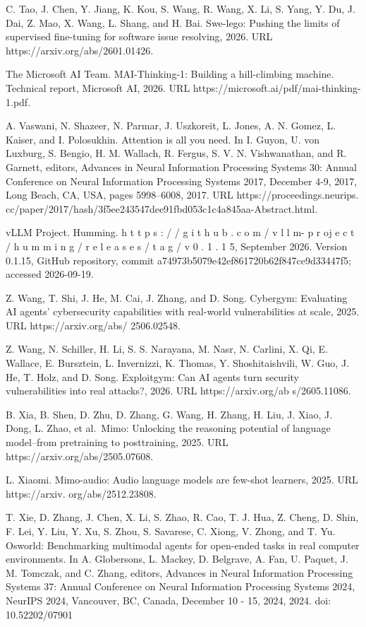 \documentclass[
  10
]{article}
\begin{document}
C. Tao, J. Chen, Y. Jiang, K. Kou, S. Wang, R. Wang, X. Li, S. Yang, Y.
Du, J. Dai, Z. Mao, X. Wang, L. Shang, and H. Bai. Swe-lego: Pushing the
limits of supervised fine-tuning for software issue resolving, 2026. URL
https://arxiv.org/abs/2601.01426.

The Microsoft AI Team. MAI-Thinking-1: Building a hill-climbing machine.
Technical report, Microsoft AI, 2026. URL
https://microsoft.ai/pdf/mai-thinking-1.pdf.

A. Vaswani, N. Shazeer, N. Parmar, J. Uszkoreit, L. Jones, A. N. Gomez,
L. Kaiser, and I. Polosukhin. Attention is all you need. In I. Guyon, U.
von Luxburg, S. Bengio, H. M. Wallach, R. Fergus, S. V. N. Vishwanathan,
and R. Garnett, editors, Advances in Neural Information Processing
Systems 30: Annual Conference on Neural Information Processing Systems
2017, December 4-9, 2017, Long Beach, CA, USA, pages 5998--6008, 2017.
URL https://proceedings.neurips.
cc/paper/2017/hash/3f5ee243547dee91fbd053c1c4a845aa-Abstract.html.

vLLM Project. Humming. h t t p s : / / g i t h u b . c o m / v l l m- p
r oj e c t / h u m m i n g / r e l e a s e s / t a g / v 0 . 1 . 1 5,
September 2026. Version 0.1.15, GitHub repository, commit
a74973b5079e42ef861720b62f847ce9d33447f5; accessed 2026-09-19.

Z. Wang, T. Shi, J. He, M. Cai, J. Zhang, and D. Song. Cybergym:
Evaluating AI agents' cybersecurity capabilities with real-world
vulnerabilities at scale, 2025. URL https://arxiv.org/abs/ 2506.02548.

Z. Wang, N. Schiller, H. Li, S. S. Narayana, M. Nasr, N. Carlini, X. Qi,
E. Wallace, E. Bursztein, L. Invernizzi, K. Thomas, Y. Shoshitaishvili,
W. Guo, J. He, T. Holz, and D. Song. Exploitgym: Can AI agents turn
security vulnerabilities into real attacks?, 2026. URL
https://arxiv.org/ab s/2605.11086.

B. Xia, B. Shen, D. Zhu, D. Zhang, G. Wang, H. Zhang, H. Liu, J. Xiao,
J. Dong, L. Zhao, et al.~Mimo: Unlocking the reasoning potential of
language model--from pretraining to posttraining, 2025. URL
https://arxiv.org/abs/2505.07608.

L. Xiaomi. Mimo-audio: Audio language models are few-shot learners,
2025. URL https://arxiv. org/abs/2512.23808.

T. Xie, D. Zhang, J. Chen, X. Li, S. Zhao, R. Cao, T. J. Hua, Z. Cheng,
D. Shin, F. Lei, Y. Liu, Y. Xu, S. Zhou, S. Savarese, C. Xiong, V.
Zhong, and T. Yu. Osworld: Benchmarking multimodal agents for open-ended
tasks in real computer environments. In A. Globersons, L. Mackey, D.
Belgrave, A. Fan, U. Paquet, J. M. Tomczak, and C. Zhang, editors,
Advances in Neural Information Processing Systems 37: Annual Conference
on Neural Information Processing Systems 2024, NeurIPS 2024, Vancouver,
BC, Canada, December 10 - 15, 2024, 2024. doi: 10.52202/07901
\end{document}
